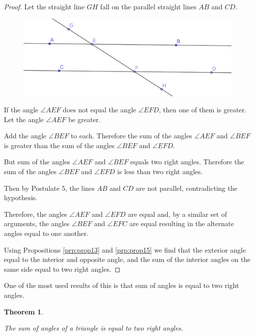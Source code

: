 \documentclass[
]{book}
\newtheorem{theorem}{Theorem}[chapter]
\theoremstyle{definition}
\theoremstyle{definition}
\theoremstyle{definition}
\theoremstyle{definition}
\theoremstyle{remark}
\begin{document}
\begin{proof}

Let the straight line \(GH\) fall on the parallel straight lines \(AB\) and \(CD\).

\begin{figure}

{\centering \includegraphics[width=0.75\linewidth]{images/Prop28} 

}

\end{figure}

If the angle \(\angle AEF\) does not equal the angle \(\angle EFD\), then one of them is greater. Let the angle \(\angle AEF\) be greater.

Add the angle \(\angle BEF\) to each. Therefore the sum of the angles \(\angle AEF\) and \(\angle BEF\) is greater than the sum of the angles \(\angle BEF\) and \(\angle EFD\).

But sum of the angles \(\angle AEF\) and \(\angle BEF\) equals two right angles. Therefore the sum of the angles \(\angle BEF\) and \(\angle EFD\) is less than two right angles.

Then by Postulate 5, the lines \(AB\) and \(CD\) are not parallel, contradicting the hypothesis.

Therefore, the angles \(\angle AEF\) and \(\angle EFD\) are equal and, by a similar set of arguments, the angles \(\angle BEF\) and \(\angle EFC\) are equal resulting in the alternate angles equal to one another.

Using Propositions \ref{prp:prop13} and \ref{prp:prop15} we find that the exterior angle equal to the interior and opposite angle, and the sum of the interior angles on the same side equal to two right angles.

\end{proof}

One of the most used results of this is that sum of angles is equal to two right angles.

\begin{theorem}
\protect\hypertarget{thm:angles-triangle}{}\label{thm:angles-triangle}

The sum of angles of a triangle is equal to two right angles.

\end{theorem}
\end{document}
